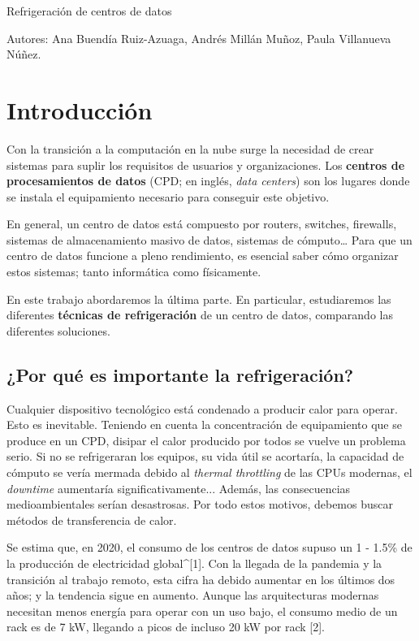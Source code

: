 
Refrigeración de centros de datos

Autores: Ana Buendía Ruiz-Azuaga, Andrés Millán Muñoz, Paula Villanueva Núñez.


\chapter{Introducción}

Con la transición a la computación en la nube surge la necesidad de crear sistemas para suplir los requisitos de usuarios y organizaciones. Los \textbf{centros de procesamientos de datos} (CPD; en inglés, \textit{data centers}) son los lugares donde se instala el equipamiento necesario para conseguir este objetivo.

En general, un centro de datos está compuesto por routers, switches, firewalls, sistemas de almacenamiento masivo de datos, sistemas de cómputo… Para que un centro de datos funcione a pleno rendimiento, es esencial saber cómo organizar estos sistemas; tanto informática como físicamente.

En este trabajo abordaremos la última parte. En particular, estudiaremos las diferentes \textbf{técnicas de refrigeración} de un centro de datos, comparando las diferentes soluciones.

\section{¿Por qué es importante la refrigeración?}


Cualquier dispositivo tecnológico está condenado a producir calor para operar. Esto es inevitable. Teniendo en cuenta la concentración de equipamiento que se produce en un CPD, disipar el calor producido por todos se vuelve un problema serio. Si no se refrigeraran los equipos, su vida útil se acortaría, la capacidad de cómputo se vería mermada debido al \textit{thermal throttling} de las CPUs modernas, el \textit{downtime} aumentaría significativamente... Además, las consecuencias medioambientales serían desastrosas. Por todo estos motivos, debemos buscar métodos de transferencia de calor.

Se estima que, en 2020, el consumo de los centros de datos supuso un 1 - 1.5\% de la producción de electricidad global^[1]. Con la llegada de la pandemia y la transición al trabajo remoto, esta cifra ha debido aumentar en los últimos dos años; y la tendencia sigue en aumento. Aunque las arquitecturas modernas necesitan menos energía para operar con un uso bajo, el consumo medio de un rack es de 7 kW, llegando a picos de incluso 20 kW por rack [2].

